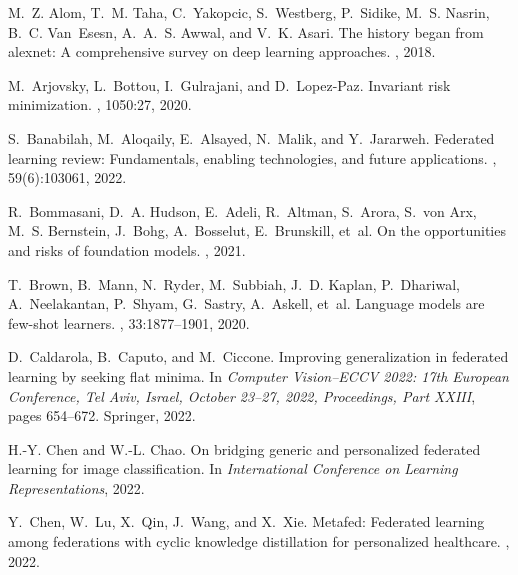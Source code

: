 \documentclass[11pt]{article}
\begin{document}
%
%

\begin{thebibliography}{10}

M.~Z. Alom, T.~M. Taha, C.~Yakopcic, S.~Westberg, P.~Sidike, M.~S. Nasrin,
  B.~C. Van~Esesn, A.~A.~S. Awwal, and V.~K. Asari.
\newblock The history began from alexnet: A comprehensive survey on deep
  learning approaches.
, 2018.

M.~Arjovsky, L.~Bottou, I.~Gulrajani, and D.~Lopez-Paz.
\newblock Invariant risk minimization.
, 1050:27, 2020.

S.~Banabilah, M.~Aloqaily, E.~Alsayed, N.~Malik, and Y.~Jararweh.
\newblock Federated learning review: Fundamentals, enabling technologies, and
  future applications.
, 59(6):103061, 2022.

R.~Bommasani, D.~A. Hudson, E.~Adeli, R.~Altman, S.~Arora, S.~von Arx, M.~S.
  Bernstein, J.~Bohg, A.~Bosselut, E.~Brunskill, et~al.
\newblock On the opportunities and risks of foundation models.
, 2021.

T.~Brown, B.~Mann, N.~Ryder, M.~Subbiah, J.~D. Kaplan, P.~Dhariwal,
  A.~Neelakantan, P.~Shyam, G.~Sastry, A.~Askell, et~al.
\newblock Language models are few-shot learners.
,
  33:1877--1901, 2020.

D.~Caldarola, B.~Caputo, and M.~Ciccone.
\newblock Improving generalization in federated learning by seeking flat
  minima.
\newblock In {\em Computer Vision--ECCV 2022: 17th European Conference, Tel
  Aviv, Israel, October 23--27, 2022, Proceedings, Part XXIII}, pages 654--672.
  Springer, 2022.

H.-Y. Chen and W.-L. Chao.
\newblock On bridging generic and personalized federated learning for image
  classification.
\newblock In {\em International Conference on Learning Representations}, 2022.

Y.~Chen, W.~Lu, X.~Qin, J.~Wang, and X.~Xie.
\newblock Metafed: Federated learning among federations with cyclic knowledge
  distillation for personalized healthcare.
, 2022.


\end{thebibliography}
\end{document}
